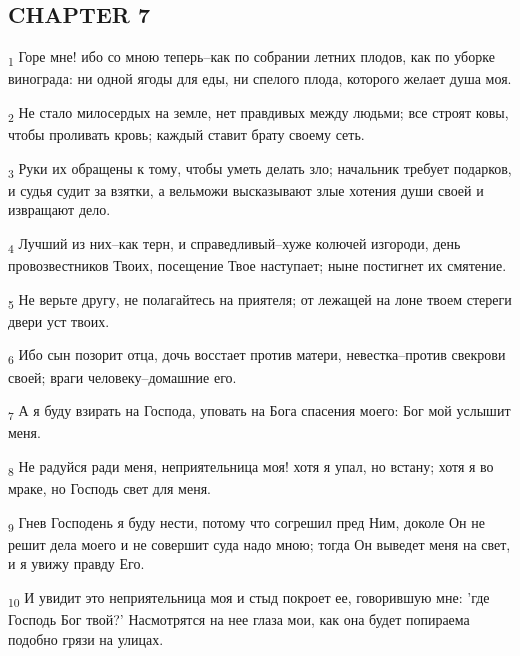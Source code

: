 \subsection{CHAPTER 7}
\begin{tcolorbox}
\textsubscript{1} Горе мне! ибо со мною теперь--как по собрании летних плодов, как по уборке винограда: ни одной ягоды для еды, ни спелого плода, которого желает душа моя.
\end{tcolorbox}
\begin{tcolorbox}
\textsubscript{2} Не стало милосердых на земле, нет правдивых между людьми; все строят ковы, чтобы проливать кровь; каждый ставит брату своему сеть.
\end{tcolorbox}
\begin{tcolorbox}
\textsubscript{3} Руки их обращены к тому, чтобы уметь делать зло; начальник требует подарков, и судья судит за взятки, а вельможи высказывают злые хотения души своей и извращают дело.
\end{tcolorbox}
\begin{tcolorbox}
\textsubscript{4} Лучший из них--как терн, и справедливый--хуже колючей изгороди, день провозвестников Твоих, посещение Твое наступает; ныне постигнет их смятение.
\end{tcolorbox}
\begin{tcolorbox}
\textsubscript{5} Не верьте другу, не полагайтесь на приятеля; от лежащей на лоне твоем стереги двери уст твоих.
\end{tcolorbox}
\begin{tcolorbox}
\textsubscript{6} Ибо сын позорит отца, дочь восстает против матери, невестка--против свекрови своей; враги человеку--домашние его.
\end{tcolorbox}
\begin{tcolorbox}
\textsubscript{7} А я буду взирать на Господа, уповать на Бога спасения моего: Бог мой услышит меня.
\end{tcolorbox}
\begin{tcolorbox}
\textsubscript{8} Не радуйся ради меня, неприятельница моя! хотя я упал, но встану; хотя я во мраке, но Господь свет для меня.
\end{tcolorbox}
\begin{tcolorbox}
\textsubscript{9} Гнев Господень я буду нести, потому что согрешил пред Ним, доколе Он не решит дела моего и не совершит суда надо мною; тогда Он выведет меня на свет, и я увижу правду Его.
\end{tcolorbox}
\begin{tcolorbox}
\textsubscript{10} И увидит это неприятельница моя и стыд покроет ее, говорившую мне: 'где Господь Бог твой?' Насмотрятся на нее глаза мои, как она будет попираема подобно грязи на улицах.
\end{tcolorbox}
